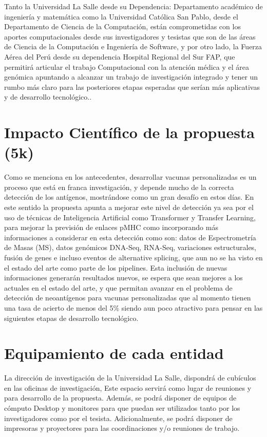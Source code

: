 \documentclass[a4paper,11pt]{article}
\begin{document}
Tanto la Universidad La Salle desde su Dependencia: Departamento académico de ingeniería y matemática como la Universidad Católica San Pablo, desde el Departamento de Ciencia de la Computación, están comprometidas con los aportes computacionales desde sus investigadores y tesistas que son de las áreas de Ciencia de la Computación e Ingeniería de Software, y por otro lado, la Fuerza Aérea del Perú desde su dependencia Hospital Regional del Sur FAP, que permitirá articular el trabajo Computacional con la atención médica y el área genómica apuntando a alcanzar un trabajo de investigación integrado y tener un rumbo más claro para las posteriores etapas esperadas que serían más aplicativas y de desarrollo tecnológico..  


\section{Impacto Científico de la propuesta (5k)}

Como se menciona en los antecedentes, desarrollar vacunas personalizadas es un proceso que está en franca investigación, y depende mucho de la correcta detección de los antígenos, mostrándose como un gran desafío en estos días. En este sentido la propuesta apunta a mejorar este nivel de detección ya sea por el uso de técnicas de Inteligencia Artificial como Transformer y Transfer Learning, para mejorar la previsión de enlaces pMHC como incorporando más informaciones a considerar en esta detección como son: datos de Espectrometría de Masas (MS), datos genómicos DNA-Seq, RNA-Seq, variaciones estructurales, fusión de genes e incluso eventos de alternative splicing, que aun no se ha visto en el estado del arte como parte de los pipelines. 
Esta inclusión de nuevas informaciones generarán resultados nuevos, se espera que sean mejores a los actuales en el estado del arte, y que permitan avanzar en el problema de detección de neoantígenos para vacunas personalizadas que al momento tienen una tasa de acierto de menos del 5\% siendo aun poco atractivo para pensar en las siguientes etapas de desarrollo tecnológico.

\section{Equipamiento de cada entidad}

La dirección de investigación de la Universidad La Salle, dispondrá de cubículos en las oficinas de investigación, Este espacio servirá como lugar de reuniones y para  desarrollo de la propuesta. Además, se podrá disponer de equipos de cómputo Desktop y monitores para que puedan ser utilizados tanto por los investigadores como por el tesista. Adicionalmente, se podrá disponer  de impresoras y proyectores para las coordinaciones y/o reuniones de trabajo.
\end{document}
